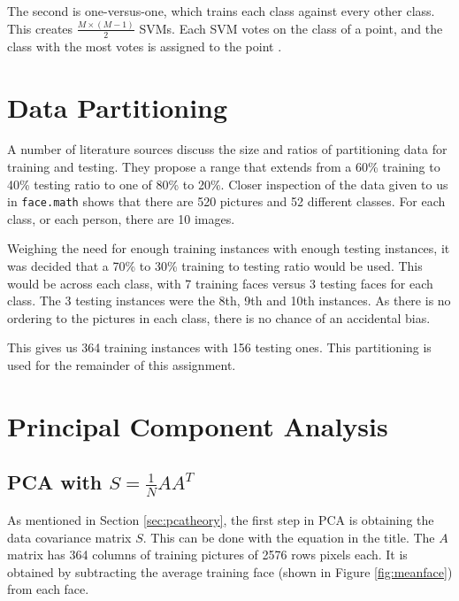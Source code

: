 \documentclass[a4paper, 10pt, conference]{ieeeconf}
\begin{document}
The second is one-versus-one, which trains each class against every other class. This creates $\frac{M \times (M-1)}{2}$ SVMs. Each SVM votes on the class of a point, and the class with the most votes is assigned to the point \cite{svm}.

%
\section{Data Partitioning}
A number of literature sources discuss the size and ratios of partitioning data for training and testing. They propose a range that extends from a 60\% training to 40\% testing ratio to one of 80\% to 20\%. Closer inspection of the data given to us in \texttt{face.math} shows that there are 520 pictures and 52 different classes. For each class, or each person, there are 10 images.

Weighing the need for enough training instances with enough testing instances, it was decided that a 70\% to 30\% training to testing ratio would be used. This would be across each class, with 7 training faces versus 3 testing faces for each class. The 3 testing instances were the 8th, 9th and 10th instances. As there is no ordering to the pictures in each class, there is no chance of an accidental bias.

This gives us 364 training instances with 156 testing ones. This partitioning is used for the remainder of this assignment.

\section{Principal Component Analysis}


\subsection{PCA with $S = \frac{1}{N}AA^{T}$}
As mentioned in Section \ref{sec:pcatheory}, the first step in PCA is obtaining the data covariance matrix $S$. This can be done with the equation in the title. The $A$ matrix has 364 columns of training pictures of 2576 rows pixels each. It is obtained by subtracting the average training face (shown in Figure \ref{fig:meanface}) from each face.
\end{document}
